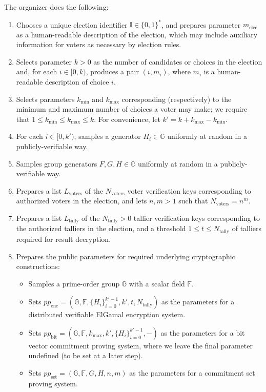 \documentclass{llncs}
\newcommand{\G}{\mathbb{G}}
\newcommand{\F}{\mathbb{F}}
\begin{document}
The organizer does the following:
\begin{enumerate}
\item Chooses a unique election identifier $\mathbb{I} \in \{0,1\}^*$, and prepares parameter $m_{\text{elec}}$ as a human-readable description of the election, which may include auxiliary information for voters as necessary by election rules.
\item Selects parameter $k > 0$ as the number of candidates or choices in the election and, for each $i \in [0,k)$, produces a pair $(i,m_i)$, where $m_i$ is a human-readable description of choice $i$.
\item Selects parameters $k_{\text{min}}$ and $k_{\text{max}}$ corresponding (respectively) to the minimum and maximum number of choices a voter may make; we require that $1 \leq k_{\text{min}} \leq k_{\text{max}} \leq k$.
For convenience, let $k' = k + k_{\text{max}} - k_{\text{min}}$.
\item For each $i \in [0,k')$, samples a generator $H_i \in \G$ uniformly at random in a publicly-verifiable way.
\item Samples group generators $F, G, H \in \G$ uniformly at random in a publicly-verifiable way.
\item Prepares a list $L_{\text{voters}}$ of the $N_{\text{voters}}$ voter verification keys corresponding to authorized voters in the election, and lets $n,m > 1$ such that $N_{\text{voters}} = n^m$.
\item Prepares a list $L_{\text{tally}}$ of the $N_{\text{tally}} > 0$ tallier verification keys corresponding to the authorized talliers in the election, and a threshold $1 \leq t \leq N_{\text{tally}}$ of talliers required for result decryption.
\item Prepares the public parameters for required underlying cryptographic constructions:
\begin{itemize}
\item Samples a prime-order group $\G$ with a scalar field $\F$.
\item Sets $pp_{\text{enc}} = (\G, \F, \{H_i\}_{i=0}^{k'-1}, k', t, N_{\text{tally}})$ as the parameters for a distributed verifiable ElGamal encryption system.
\item Sets $pp_{\text{bit}} = (\G, \F, k_{\text{max}}, k', \{H_i\}_{i=0}^{k'-1}, -)$ as the parameters for a bit vector commitment proving system, where we leave the final parameter undefined (to be set at a later step).
\item Sets $pp_{\text{set}} = (\G, \F, G, H, n, m)$ as the parameters for a commitment set proving system.

\end{itemize}
\end{enumerate}
\end{document}
